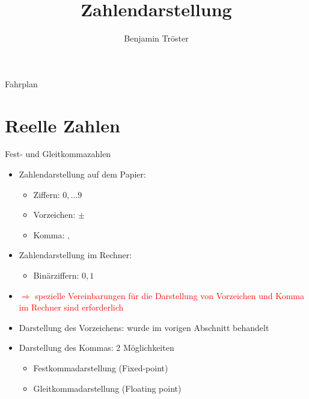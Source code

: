 \documentclass[12pt%
,aspectratio=169%
]{beamer}
\author{Benjamin Tröster}
\title[Zahlendarstellung]{Zahlendarstellung}
\institute[HTW Berlin]{Hochschule für Technik und Wirtschaft Berlin}
\begin{document}
\begin{frame}
\titlepage
\end{frame}

\begin{frame}{Fahrplan}
\tableofcontents[hideothersubsections]
\end{frame}

\section{Reelle Zahlen}

\begin{frame}{Fest- und Gleitkommazahlen}
\begin{itemize}
	\item Zahlendarstellung auf dem Papier:
	\begin{itemize}
		\item Ziffern: $0, \ldots 9$
		\item Vorzeichen: $\pm$
		\item Komma: $,$
	\end{itemize}
	\item Zahlendarstellung im Rechner:
	\begin{itemize}
		\item Binärziffern: $0, 1$
	\end{itemize}
	\item \textcolor{red}{$\Rightarrow$ spezielle Vereinbarungen für die Darstellung von Vorzeichen und Komma im Rechner sind erforderlich}
	\item Darstellung des Vorzeichens: wurde im vorigen Abschnitt behandelt
	\item Darstellung des Kommas: 2 Möglichkeiten
	\begin{itemize}
		\item Festkommadarstellung (Fixed-point)
		\item Gleitkommadarstellung (Floating point)
	\end{itemize}
\end{itemize}
\end{frame}
\end{document}
